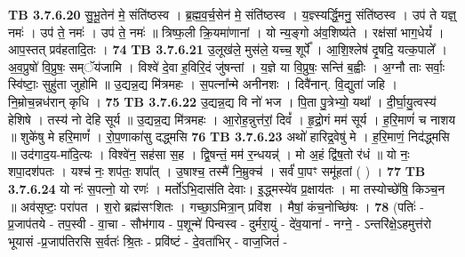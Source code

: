 \documentclass[17pt]{extarticle}
\begin{document}
{{{{{{{{{{{{{{{{{{{                                \textbf{ TB 3.7.6.20} \newline
                  सु॒भू॒तेन॑ मे॒ संति॑ष्ठस्व । ब्र॒ह्म॒व॒र्च॒सेन॑ मे॒ संति॑ष्ठस्व । य॒ज्ञ्स्यर्द्धि॒मनु॒ संति॑ष्ठस्व । उप॑ ते यज्ञ्॒ नमः॑ । उप॑ ते॒ नमः॑ । उप॑ ते॒ नमः॑ ॥ त्रिष्फ॒ली क्रि॒यमा॑णानां । यो न्य॒ङ्गो अ॑व॒शिष्य॑ते । रक्ष॑सां भाग॒धेयं᳚ । आप॒स्तत् प्रव॑हतादि॒तः । \textbf{ 74} \newline
                  \newline
                                \textbf{ TB 3.7.6.21} \newline
                  उ॒लूख॑ले॒ मुस॑ले॒ यच्च॒ शूर्पे᳚ । आ॒शि॒श्लेष॑ दृ॒षदि॒ यत्क॒पाले᳚ । अ॒व॒प्रुषो॑ वि॒प्रुषः॒ सम्ॅय॑जामि । विश्वे॑ दे॒वा ह॒विरि॒दं जु॑षन्तां । य॒ज्ञे या वि॒प्रुषः॒ सन्ति॑ ब॒ह्वीः । अ॒ग्नौ ताः सर्वाः॒ स्वि॑ष्टाः॒ सुहु॑ता जुहोमि ॥ उ॒द्यन्न॒द्य मि॑त्रमहः । स॒पत्ना᳚न्मे अनीनशः । दिवै॑नान्. वि॒द्युता॑ जहि । नि॒म्रोच॒न्नध॑रान् कृधि । \textbf{ 75} \newline
                  \newline
                                \textbf{ TB 3.7.6.22} \newline
                  उ॒द्यन्न॒द्य वि नो॑ भज । पि॒ता पु॒त्रेभ्यो॒ यथा᳚ । दी॒र्घा॒यु॒त्वस्य॑ हेशिषे । तस्य॑ नो देहि सूर्य ॥ उ॒द्यन्न॒द्य मि॑त्रमहः । आ॒रोह॒न्नुत्त॑रां॒ दिवं᳚ । हृ॒द्रो॒गं मम॑ सूर्य । ह॒रि॒माणं॑ च नाशय ॥ शुके॑षु मे हरि॒माणं᳚ । रो॒प॒णाका॑सु दद्ध्मसि \textbf{ 76} \newline
                  \newline
                                \textbf{ TB 3.7.6.23} \newline
                  अथो॑ हारिद्र॒वेषु॑ मे । ह॒रि॒माणं॒ निद॑द्ध्मसि ॥ उद॑गाद॒य-मा॑दि॒त्यः । विश्वे॑न॒ सह॑सा स॒ह । द्वि॒षन्तं॒ मम॑ र॒न्धयन्न्॑ । मो अ॒हं द्वि॑ष॒तो र॑धं ॥ यो नः॒ शपा॒दश॑पतः । यश्च॑ नः॒ शप॑तः॒ शपा᳚त् । उ॒षाश्च॒ तस्मै॑ नि॒म्रुक्च॑ । सर्वं॑ पा॒पꣳ समू॑हतां ( ) । \textbf{ 77} \newline
                  \newline
                                \textbf{ TB 3.7.6.24} \newline
                  यो नः॑ स॒पत्नो॒ यो रणः॑ । मर्तो॑ऽभि॒दास॑ति देवाः। इ॒द्ध्मस्ये॑व प्र॒क्षाय॑तः । मा तस्योच्छे॑षि॒ किञ्च॒न ॥ अव॑सृष्टः॒ परा॑पत । श॒रो ब्रह्म॑सꣳशितः । गच्छा॒ऽमित्रा॒न् प्रवि॑श । मैषां॒ कंच॒नोच्छि॑षः । \textbf{ 78} \newline
                  \newline
                                    (पतिः॑ - प्र॒जाप॑तये - तप॒स्वी - वा॒चा - सौभ॑गाय - प॒शून्मे॑ पिन्वस्व - दुर्मरा॒युं - दे॑व॒याना॑ - नग्ने॒ - ऽन्तरि॑क्षे॒ऽहमुत्त॑रो भूयासं -प्र॒जाप॑तिरसि स॒र्वतः॑ श्रि॒तः - प्रवि॑ष्टं - दे॒वता॑भिर् - वाज॒जितं॑ - 
}}}}}}}}}}}}}}}}}}}
\end{document}

